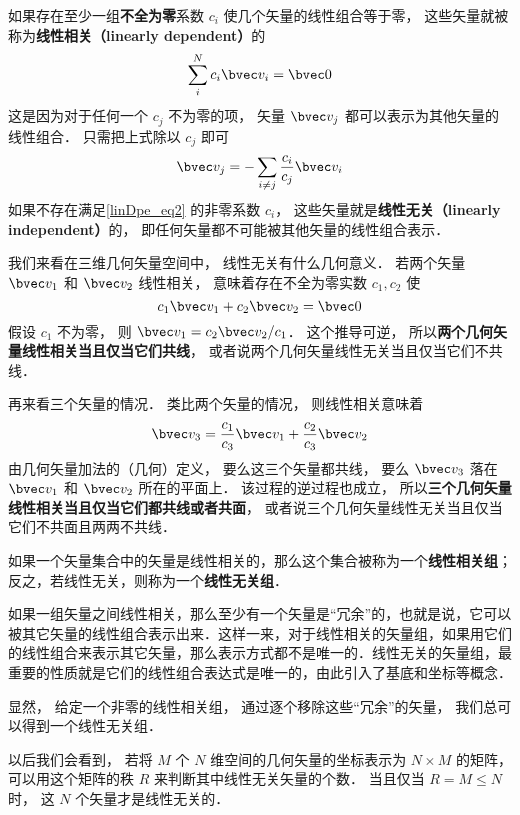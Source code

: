 

如果存在至少一组\textbf{不全为零}系数 $c_i$ 使几个矢量的线性组合等于零， 这些矢量就被称为\textbf{线性相关（linearly dependent）}的
\begin{equation}\label{linDpe_eq2}
\sum_i^N c_i \bvec v_i = \bvec 0
\end{equation}
这是因为对于任何一个 $c_j$ 不为零的项， 矢量 $\bvec v_j$ 都可以表示为其他矢量的线性组合． 只需把上式除以 $c_j$ 即可
\begin{equation}\label{linDpe_eq3}
\bvec v_j = -\sum_{i \ne j}\frac{c_i}{c_j} \bvec v_i
\end{equation}
如果不存在满足\autoref{linDpe_eq2} 的非零系数 $c_i$， 这些矢量就是\textbf{线性无关（linearly independent）}的， 即任何矢量都不可能被其他矢量的线性组合表示．

\begin{example}{ }\label{linDpe_ex1}
我们来看在三维几何矢量空间中， 线性无关有什么几何意义． 若两个矢量 $\bvec v_1$ 和 $\bvec v_2$ 线性相关， 意味着存在不全为零实数 $c_1, c_2$ 使
\begin{equation}
c_1 \bvec v_1 + c_2 \bvec v_2 = \bvec 0
\end{equation}
假设 $c_1$ 不为零， 则 $\bvec v_1 = c_2 \bvec v_2 / c_1$． 这个推导可逆， 所以\textbf{两个几何矢量线性相关当且仅当它们共线}， 或者说两个几何矢量线性无关当且仅当它们不共线．

再来看三个矢量的情况． 类比两个矢量的情况， 则线性相关意味着
\begin{equation}
\bvec v_3 = \frac{c_1}{c_3} \bvec v_1 +  \frac{c_2}{c_3} \bvec v_2
\end{equation}
由几何矢量加法的（几何）定义， 要么这三个矢量都共线， 要么 $\bvec v_3$ 落在 $\bvec v_1$ 和 $\bvec v_2$ 所在的平面上． 该过程的逆过程也成立， 所以\textbf{三个几何矢量线性相关当且仅当它们都共线或者共面}， 或者说三个几何矢量线性无关当且仅当它们不共面且两两不共线．
\end{example}

如果一个矢量集合中的矢量是线性相关的，那么这个集合被称为一个\textbf{线性相关组}；反之，若线性无关，则称为一个\textbf{线性无关组}．

如果一组矢量之间线性相关，那么至少有一个矢量是“冗余”的，也就是说，它可以被其它矢量的线性组合表示出来．这样一来，对于线性相关的矢量组，如果用它们的线性组合来表示其它矢量，那么表示方式都不是唯一的．线性无关的矢量组，最重要的性质就是它们的线性组合表达式是唯一的，由此引入了基底和坐标等概念．

显然， 给定一个非零的线性相关组， 通过逐个移除这些“冗余”的矢量， 我们总可以得到一个线性无关组．

以后我们会看到， 若将 $M$ 个 $N$ 维空间的几何矢量的坐标表示为 $N\times M$ 的矩阵， 可以用这个矩阵的秩 $R$ 来判断其中线性无关矢量的个数． 当且仅当 $R = M \leqslant N$ 时， 这 $N$ 个矢量才是线性无关的．
